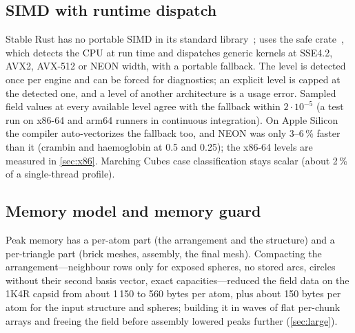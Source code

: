 \subsection{SIMD with runtime dispatch}

Stable Rust has no portable SIMD in its standard library~\cite{portablesimd};
\sesmesh{} uses the safe  crate~\cite{fearlesssimd},
which detects the CPU at run time and dispatches generic kernels at SSE4.2,
AVX2, AVX-512 or NEON width, with a portable fallback. The level is
detected once per engine and can be forced for diagnostics; an explicit
level is capped at the detected one, and a level of another architecture
is a usage error. Sampled field values at every available level agree with
the fallback within $2\cdot10^{-5}$\Ang{} (a test run on x86-64 and arm64
runners in continuous integration). On Apple Silicon the compiler
auto-vectorizes the fallback too, and NEON was only 3--6\,\% faster than it
(crambin and haemoglobin at 0.5 and 0.25\Ang); the x86-64 levels are measured in \cref{sec:x86}. Marching Cubes
case classification stays scalar (about 2\,\% of a single-thread profile).

\subsection{Memory model and memory guard}
\label{sec:memory}

Peak memory has a per-atom part (the arrangement and the structure) and a
per-triangle part (brick meshes, assembly, the final mesh). Compacting the
arrangement---neighbour rows only for exposed spheres, no stored arcs,
circles without their second basis vector, exact capacities---reduced the
field data on the 1K4R capsid from about 1\,150 to 560 bytes per atom, plus
about 150 bytes per atom for the input structure and spheres; building it
in waves of flat per-chunk arrays and freeing the field before assembly
lowered peaks further (\cref{sec:large}).

